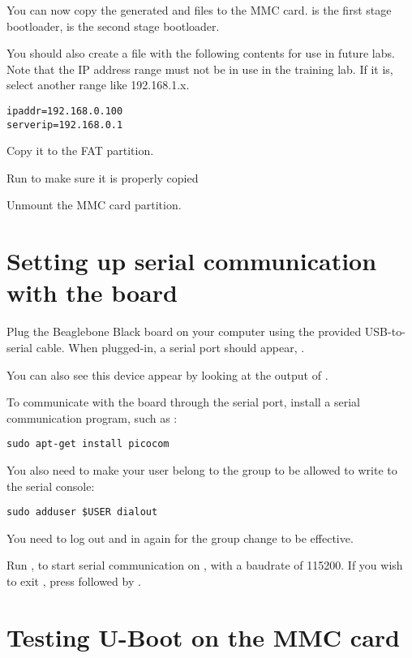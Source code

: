 You can now copy the generated  and  files
to the MMC card.  is the first stage bootloader,
 is the second stage bootloader.

You should also create a file  with the following contents for use in future labs.
Note that the IP address range must not be in use in the training lab. If it is, select another
range like 192.168.1.x.

\begin{verbatim}
ipaddr=192.168.0.100
serverip=192.168.0.1
\end{verbatim}

Copy it to the FAT partition.


Run  to make sure it is properly copied

Unmount the MMC card partition.

\section{Setting up serial communication with the board}

Plug the Beaglebone Black board on your computer using the provided
USB-to-serial cable. When plugged-in, a serial port should appear,
.

You can also see this device appear by looking at the output of
.

To communicate with the board through the serial port, install a
serial communication program, such as :

\begin{verbatim}
sudo apt-get install picocom
\end{verbatim}

You also need to make your user belong to the  group to be
allowed to write to the serial console:

\begin{verbatim}
sudo adduser $USER dialout
\end{verbatim}

You need to log out and in again for the group change to be effective.

Run , to start serial
communication on , with a baudrate of 115200. If
you wish to exit , press \code{[Ctrl][a]} followed by
\code{[Ctrl][x]}.

\section{Testing U-Boot on the MMC card}


